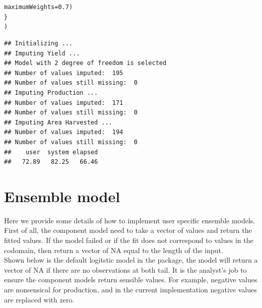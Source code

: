 \documentclass[nojss]{jss}\usepackage[]{graphicx}\usepackage[]{color}
\makeatletter
\newcommand{\hlnum}[1]{\textcolor[rgb]{0.686,0.059,0.569}{#1}}%
\newcommand{\hlstd}[1]{\textcolor[rgb]{0.345,0.345,0.345}{#1}}%
\newcommand{\hlkwc}[1]{\textcolor[rgb]{0.333,0.667,0.333}{#1}}%
\newenvironment{kframe}{%
 \def\at@end@of@kframe{}%
 \ifinner\ifhmode%
  \def\at@end@of@kframe{\end{minipage}}%
  \begin{minipage}{\columnwidth}%
 \fi\fi%
 \def\FrameCommand##1{\hskip\@totalleftmargin \hskip-\fboxsep
 \colorbox{shadecolor}{##1}\hskip-\fboxsep
     \hskip-\linewidth \hskip-\@totalleftmargin \hskip\columnwidth}%
 \MakeFramed {\advance\hsize-\width
   \@totalleftmargin\z@ \linewidth\hsize
   \@setminipage}}%
 {\par\unskip\endMakeFramed%
 \at@end@of@kframe}
\newenvironment{knitrout}{}{} %
\makeatother
\begin{document}
\begin{knitrout}
\begin{kframe}
\begin{alltt}
                                   \hlkwc{maximumWeights} \hlstd{=} \hlnum{0.7}\hlstd{)}
    \hlstd{\}}
    \hlstd{)}
\end{alltt}
\begin{verbatim}
## Initializing ... 
## Imputing Yield ...
## Model with 2 degree of freedom is selected
## Number of values imputed:  195 
## Number of values still missing:  0 
## Imputing Production ...
## Number of values imputed:  171 
## Number of values still missing:  0 
## Imputing Area Harvested ...
## Number of values imputed:  194 
## Number of values still missing:  0
##    user  system elapsed 
##   72.89   82.25   66.46
\end{verbatim}
\end{kframe}
\end{knitrout}




\section{Ensemble model}
Here we provide some details of how to implement user specific
ensemble models.\\

First of all, the component model need to take a vector of values and
return the fitted values. If the model failed or if the fit does not
correspond to values in the codomain, then return a vector of NA equal
to the length of the input.\\

Shown below is the default logitstic model in the package, the model
will return a vector of NA if there are no observations at both
tail. It is the analyst's job to ensure the component models return
sensible values. For example, negative values are nonsensical for
production, and in the current implementation negative values are
replaced with zero.
\end{document}
